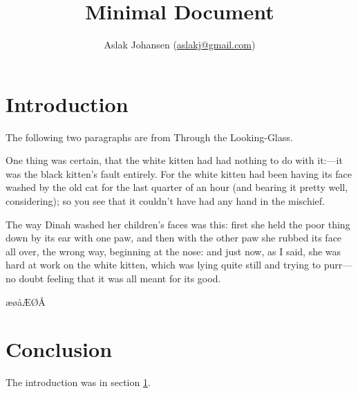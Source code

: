 \documentclass[10pt]{article}
\begin{document}
\title{Minimal Document}
\author{Aslak Johansen (\href{mailto:aslakj@gmail.com}{aslakj@gmail.com})}
\maketitle

\section{Introduction}
\label{sec:intro}

The following two paragraphs are from Through the Looking-Glass.

One thing was certain, that the white kitten had had nothing to do with it:—it was the black kitten’s fault entirely. For the white kitten had been having its face washed by the old cat for the last quarter of an hour (and bearing it pretty well, considering); so you see that it couldn’t have had any hand in the mischief.

The way Dinah washed her children’s faces was this: first she held the poor thing down by its ear with one paw, and then with the other paw she rubbed its face all over, the wrong way, beginning at the nose: and just now, as I said, she was hard at work on the white kitten, which was lying quite still and trying to purr—no doubt feeling that it was all meant for its good. 

æøåÆØÅ

\section{Conclusion}

The introduction was in section \ref{sec:intro}.
\end{document}
